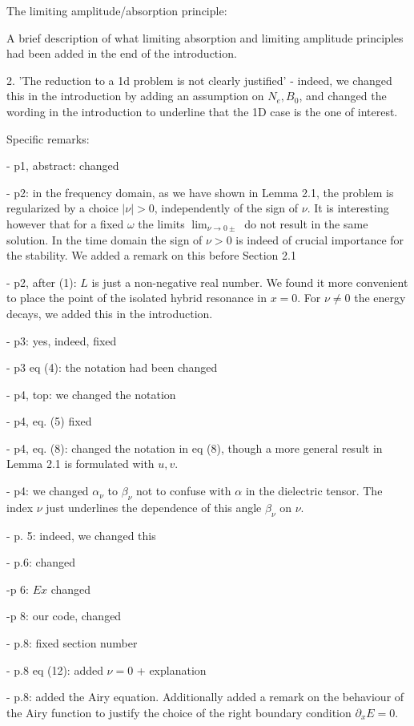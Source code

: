 \documentclass[a4paper,10pt]{article}
\begin{document}
The limiting amplitude/absorption principle: 

A brief description of what limiting absorption and limiting amplitude principles had been added in the end of the introduction.

2. 'The reduction to a 1d problem is not clearly justified' - indeed, we changed this in the introduction by adding an assumption on $N_e, B_0$, 
and changed the wording in the introduction to underline that the 1D case is the one of interest. 


Specific remarks: 

- p1, abstract: changed

- p2: in the frequency domain, as we have shown in Lemma 2.1, the problem is regularized by a choice $|\nu|>0$, independently of the sign of $\nu$. 
It is interesting however that for a fixed $\omega$ the limits $\lim_{\nu\rightarrow 0\pm}$ do not result in the same solution. 
In the time domain the sign of $\nu>0$ is indeed of crucial importance for the stability. We added a remark on this before Section 2.1  

- p2, after (1): $L$ is just a non-negative real number. We found it more convenient to place the point of the isolated hybrid resonance in $x=0$.
For $\nu\neq 0$ the energy decays, we added this in the introduction.


- p3: yes, indeed, fixed

- p3 eq (4): the notation had been changed
  
- p4, top: we changed the notation 

- p4, eq. (5) fixed

- p4, eq. (8): changed the notation in eq (8), though a more general result in Lemma 2.1 is formulated with $u,v$. 

- p4: we changed $\alpha_{\nu}$ to $\beta_{\nu}$ not to confuse with $\alpha$ in the dielectric tensor. The index $\nu$ 
just underlines the dependence of this angle $\beta_{\nu}$ on $\nu$.

- p. 5: indeed, we changed this 

- p.6:  changed

-p 6: $Ex$ changed

-p 8: our code, changed

 - p.8: fixed section number
 
 - p.8 eq (12): added $\nu=0$ + explanation
 
 - p.8: added the Airy equation. Additionally added a remark on the behaviour of the Airy function to justify the choice of the right boundary 
 condition $\partial_x E=0$. 
 
\end{document}
